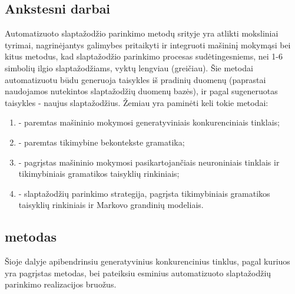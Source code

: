 \documentclass{VUMIFInfBakalaurinis}
\begin{document}

\subsection{Ankstesni darbai}
Automatizuoto slaptažodžio parinkimo metodų srityje yra atlikti moksliniai 
tyrimai, nagrinėjantys galimybes pritaikyti ir integruoti mašininį mokymąsi bei 
kitus metodus, kad slaptažodžio parinkimo procesas sudėtingesniems, nei 1-6 
simbolių ilgio slaptažodžiams, vyktų lengviau (greičiau). Šie metodai 
automatizuotu būdu generuoja taisykles iš pradinių duomenų (paprastai naudojamos 
nutekintos slaptažodžių duomenų bazės), ir pagal sugeneruotas taisykles - naujus 
slaptažodžius. Žemiau yra paminėti keli tokie metodai:
\begin{enumerate}
  \item {} - paremtas mašininio mokymosi generatyviniais 
    konkurenciniais tinklais;
  \item {} - paremtas tikimybine bekontekste gramatika;
  \item {} - pagrįstas mašininio mokymosi pasikartojančiais 
    neuroniniais tinklais ir tikimybiniais gramatikos taisyklių rinkiniais;
  \item {} - slaptažodžių parinkimo strategija, pagrįsta 
    tikimybiniais gramatikos taisyklių rinkiniais ir Markovo grandinių 
    modeliais.
\end{enumerate}



\subsection{ metodas}
Šioje dalyje apibendrinsiu generatyvinius konkurencinius tinklus, pagal kuriuos 
yra pagrįstas  metodas, bei pateiksiu esminius automatizuoto 
slaptažodžių parinkimo realizacijos bruožus.
\end{document}
